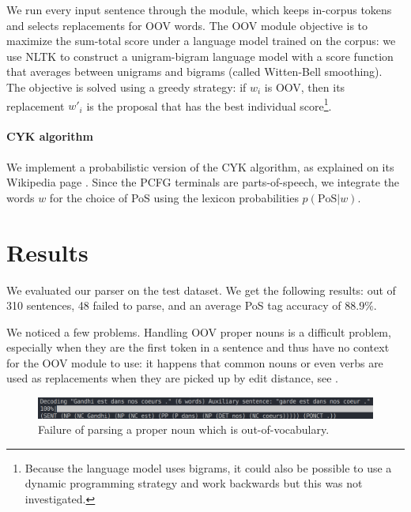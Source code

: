 \documentclass[11pt]{article}
\begin{document}
We run every input sentence through the module, which keeps in-corpus tokens and selects replacements for OOV words. The OOV module objective is to maximize the sum-total score under a language model trained on the corpus: we use NLTK to construct a unigram-bigram language model with a score function that averages between unigrams and bigrams (called Witten-Bell smoothing). The objective is solved using a greedy strategy: if $w_i$ is OOV, then its replacement $w'_i$ is the proposal that has the best individual score\footnote{Because the language model uses bigrams, it could also be possible to use a dynamic programming strategy and work backwards but this was not investigated.}.

\paragraph{CYK algorithm}

We implement a probabilistic version of the CYK algorithm, as explained on its Wikipedia page \cite{wiki:CYK}. Since the PCFG terminals are parts-of-speech, we integrate the words $w$ for the choice of PoS using the lexicon probabilities $p(\mathrm{PoS}|w)$.

\section{Results}


We evaluated our parser on the test dataset. We get the following results: out of 310 sentences, 48 failed to parse, and an average PoS tag accuracy of $88.9\%$.

We noticed a few problems. Handling OOV proper nouns is a difficult problem, especially when they are the first token in a sentence and thus have no context for the OOV module to use: it happens that common nouns or even verbs are used as replacements when they are picked up by edit distance, see .

\begin{figure}[ht!]
	\centering
	\includegraphics[width=\linewidth]{gandhi-garde.png}
	\caption{Failure of parsing a proper noun which is out-of-vocabulary.}
	\label{fig:npParseFailure_didiersoulage}
\end{figure}


\printbibliography{}
\end{document}
